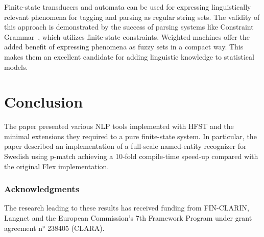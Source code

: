 \documentclass{llncs}
\begin{document}
Finite-state transducers and automata can be used for expressing
linguistically relevant phenomena for tagging and parsing as regular
string sets. The validity of this approach is demonstrated by the
success of parsing systems like Constraint
Grammar~\cite{karlsson/1990}, which utilizes finite-state
constraints. Weighted machines offer the added benefit of expressing
phenomena as fuzzy sets in a compact way. This makes them an excellent
candidate for adding linguistic knowledge to statistical models.

\section{Conclusion}\label{hfst:conclusion}
The paper presented various NLP tools implemented with HFST and the minimal extensions they required to a pure finite-state system. In particular, the paper described an implementation of a full-scale named-entity recognizer for Swedish using p-match achieving a 10-fold compile-time speed-up compared with the original Flex implementation.

\subsubsection*{Acknowledgments}
The research leading to these results has received funding from FIN-CLARIN, Langnet and the
European Commission's 7th Framework Program under grant agreement n° 238405 (CLARA).




\end{document}
